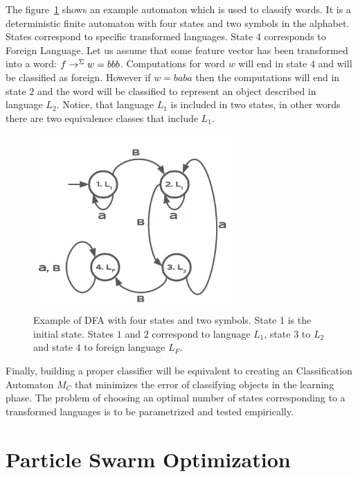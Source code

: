\documentclass{mini}
\begin{document}
The figure~\ref{fig:class_dfa} shows an example automaton which is used to classify words. It is a deterministic finite automaton with four states and two symbols in the alphabet. States correspond to specific transformed languages. State $4$ corresponds to Foreign Language. Let us assume that some feature vector has been transformed into a word: $f \rightarrow^{\Sigma} w = bbb$. Computations for word $w$ will end in state $4$ and will be classified as foreign. However if $w = baba$ then the computations will end in state $2$ and the word will be classified to represent an object described in language $L_2$. Notice, that language $L_1$ is included in two states, in other words there are two equivalence classes that include $L_1$.

\begin{figure}[H]
    \centering
    \includegraphics[width=0.7\textwidth]{../uml/states/dfa.jpg}
    \caption{Example of DFA with four states and two symbols. State 1 is the initial state. States $1$ and $2$ correspond to language $L_{1}$, state $3$ to $L_2$ and state $4$ to foreign language $L_F$.}
    \label{fig:class_dfa}
\end{figure}

Finally, building a proper classifier will be equivalent to creating an Classification Automaton $M_{C}$ that minimizes the error of classifying objects in the learning phase. The problem of choosing an optimal number of states corresponding to a transformed languages is to be parametrized and tested empirically.


\chapter{Particle Swarm Optimization}\label{chap:pso}
\end{document}
